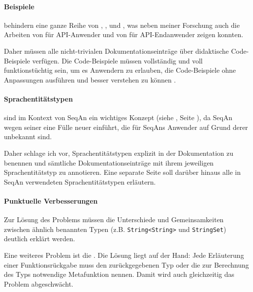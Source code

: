 \paragraph{Beispiele}
 behindern eine ganze Reihe von , , und , was neben meiner Forschung auch die Arbeiten von \cite{Rosson:1996da,Stylos:2006td} für API-Anwender und von \cite{Wiedenbeck:kt,Rosson:2005hw} für API-Endanwender zeigen konnten.

Daher müssen alle nicht-trivialen Dokumentationseinträge über didaktische Code-Beispiele verfügen. Die Code-Beispiele müssen vollständig und voll funktionstüchtig sein, um es Anwendern zu erlauben, die Code-Beispiele ohne Anpassungen ausführen und besser verstehen zu können \citep{Rosson:1996da,Robillard:2010bh}.

\paragraph{Sprachentitätstypen} sind im Kontext von SeqAn ein wichtiges Konzept (siehe , Seite \pageref{sec:gt-let}), da SeqAn wegen seiner  eine Fülle neuer  einführt, die für SeqAns Anwender auf Grund derer  unbekannt sind.

Daher schlage ich vor, Sprachentitätstypen explizit in der Dokumentation zu benennen und sämtliche Dokumentationseinträge mit ihrem jeweiligen Sprachentitätstyp zu annotieren. Eine separate Seite soll darüber hinaus alle in SeqAn verwendeten Sprachentitätstypen erläutern.

\paragraph{Punktuelle Verbesserungen}
Zur Lösung des Problems  müssen die Unterschiede und Gemeinsamkeiten zwischen ähnlich benannten Typen (z.B. \texttt{String<String>} und \texttt{StringSet}) deutlich erklärt werden.

Eine weiteres Problem ist die . Die Lösung liegt auf der Hand: Jede Erläuterung einer Funktionsrückgabe muss den zurückgegebenen Typ oder die zur Berechnung des Typs notwendige Metafunktion nennen. Damit wird auch gleichzeitig das Problem  abgeschwächt.



